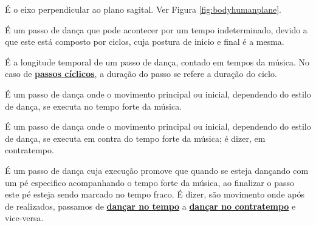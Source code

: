 \begin{definition} 
\label{def:EixoSagital}
É o eixo perpendicular ao plano sagital.
Ver Figura \ref{fig:bodyhumanplane}.
\end{definition}

\begin{definition} 
\label{def:PassoCiclico}
É um passo de dança que pode acontecer por um tempo indeterminado,
devido a que este está composto por ciclos, cuja postura de inicio e final é a mesma.
\end{definition}

\begin{definition} 
\label{def:DuracaoDoPasso}
É a longitude temporal de um passo de dança, contado em tempos da música.
No caso de \hyperref[def:PassoCiclico]{\textbf{passos cíclicos}}, a duração do passo se refere a duração do ciclo.
\end{definition}


\begin{definition} 
\label{def:DancaNoTempo}
É um passo de dança onde o movimento principal ou inicial, dependendo do estilo de dança, 
se executa no tempo forte da música.
\end{definition}

\begin{definition} 
\label{def:DancaNoContratempo}
É um passo de dança onde o movimento principal ou inicial, dependendo do estilo de dança, 
se executa em contra do tempo forte da música; é dizer, em contratempo.
\end{definition}

\begin{definition} 
\label{def:PassoAContratempo}
É um passo de dança cuja execução promove que quando se esteja dançando com um pé especifico acompanhando o tempo forte da música,
ao finalizar o passo este pé esteja sendo marcado no tempo fraco.
É dizer, são movimento onde após de realizados, passamos de \hyperref[def:DancaNoTempo]{\textbf{dançar no tempo}} a \hyperref[def:DancaNoContratempo]{\textbf{dançar no contratempo}} e vice-versa. 
\end{definition}



